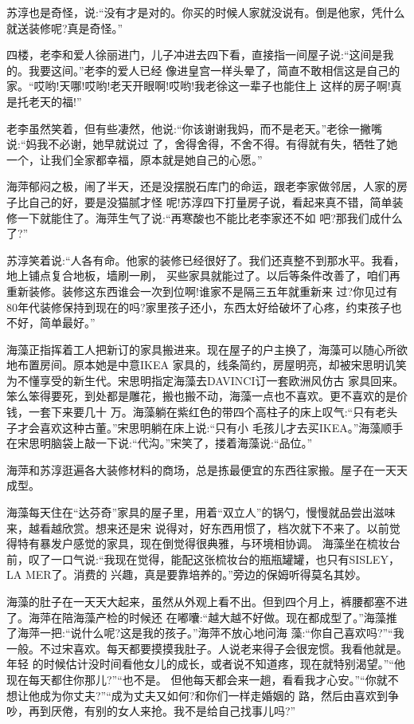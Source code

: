 \documentclass[11pt,a4paper,onecolumn]{article}
\begin{document}
苏淳也是奇怪，说:``没有才是对的。你买的时候人家就没说有。倒是他家，凭什么就送装修呢?真是奇怪。''

四楼，老李和爱人徐丽进门，儿子冲进去四下看，直接指一间屋子说:``这间是我的。我要这间。''老李的爱人已经
像进皇宫一样头晕了，简直不敢相信这是自己的家。``哎哟!天哪!哎哟!老天开眼啊!哎哟!我老徐这一辈子也能住上
这样的房子啊!真是托老天的福!''

老李虽然笑着，但有些凄然，他说:``你该谢谢我妈，而不是老天。''老徐一撇嘴说:``妈我不必谢，她早就说过
了，舍得舍得，不舍不得。有得就有失，牺牲了她一个，让我们全家都幸福，原本就是她自己的心愿。''

海萍郁闷之极，闹了半天，还是没摆脱石库门的命运，跟老李家做邻居，人家的房子比自己的好，要是没猫腻才怪
呢!苏淳四下打量房子说，看起来真不错，简单装修一下就能住了。海萍生气了说:``再寒酸也不能比老李家还不如
吧?那我们成什么了?''

苏淳笑着说:``人各有命。他家的装修已经很好了。我们还真整不到那水平。我看，地上铺点复合地板，墙刷一刷，
买些家具就能过了。以后等条件改善了，咱们再重新装修。装修这东西谁会一次到位啊!谁家不是隔三五年就重新来
过?你见过有80年代装修保持到现在的吗?家里孩子还小，东西太好给破坏了心疼，约束孩子也不好，简单最好。''

海藻正指挥着工人把新订的家具搬进来。现在屋子的户主换了，海藻可以随心所欲地布置房间。原本她是中意IKEA
家具的，线条简约，房屋明亮，却被宋思明讥笑为不懂享受的新生代。宋思明指定海藻去DAVINCI订一套欧洲风仿古
家具回来。笨么笨得要死，到处都是雕花，搬也搬不动，海藻一点也不喜欢。更不喜欢的是价钱，一套下来要几十
万。海藻躺在紫红色的带四个高柱子的床上叹气:``只有老头子才会喜欢这种古董。''宋思明躺在床上说:``只有小
毛孩儿才去买IKEA。''海藻顺手在宋思明脑袋上敲一下说:``代沟。''宋笑了，搂着海藻说:``品位。''

海萍和苏淳逛遍各大装修材料的商场，总是拣最便宜的东西往家搬。屋子在一天天成型。

海藻每天住在``达芬奇''家具的屋子里，用着``双立人''的锅勺，慢慢就品尝出滋味来，越看越欣赏。想来还是宋
说得对，好东西用惯了，档次就下不来了。以前觉得特有暴发户感觉的家具，现在倒觉得很典雅，与环境相协调。
海藻坐在梳妆台前，叹了一口气说:``我现在觉得，能配这张梳妆台的瓶瓶罐罐，也只有SISLEY，LA MER了。消费的
兴趣，真是要靠培养的。''旁边的保姆听得莫名其妙。

海藻的肚子在一天天大起来，虽然从外观上看不出。但到四个月上，裤腰都塞不进了。海萍在陪海藻产检的时候还
在嘟囔:``越大越不好做。现在都成型了。''海藻推了海萍一把:``说什么呢?这是我的孩子。''海萍不放心地问海
藻:``你自己喜欢吗?''``我一般。不过宋喜欢。每天都要摸摸我肚子。人说老来得子会很宠惯。我看他就是。年轻
的时候估计没时间看他女儿的成长，或者说不知道疼，现在就特别渴望。''``他现在每天都住你那儿?''``也不是。
但他每天都会来一趟，看看我才心安。''``你就不想让他成为你丈夫?''``成为丈夫又如何?和你们一样走婚姻的
路，然后由喜欢到争吵，再到厌倦，有别的女人来抢。我不是给自己找事儿吗?''
\end{document}
